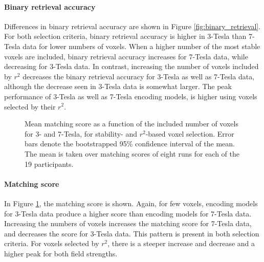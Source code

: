\paragraph{Binary retrieval accuracy}

Differences in binary retrieval accuracy are shown in Figure \ref{fig:binary_retrieval}. For both selection criteria, binary retrieval
accuracy is higher in 3-Tesla than 7-Tesla data for lower numbers of voxels.
When a higher number of the most stable voxels are included, binary retrieval accuracy increases for 7-Tesla data, while decreasing for 3-Tesla data.    
In contrast, increasing the number of voxels included by $r^2$ decreases the
binary retrieval accuracy for 3-Tesla as well as 7-Tesla data, although the
decrease seen in 3-Tesla data is somewhat larger. The peak
performance of 3-Tesla as well as 7-Tesla encoding models, is higher using
voxels selected by their $r^2$.

\begin{figure}
  \centering
  \def\svgwidth{\linewidth}
  


  \caption{Mean matching score as a function of the included number of
  voxels for 3- and 7-Tesla, for stability- and $r^2$-based voxel selection. Error bars denote the bootstrapped 95\% confidence
  interval of the mean. The mean is taken over matching scores of
  eight runs for each of the 19 participants.}

 \label{fig:matching_scores}
\end{figure}

\paragraph{Matching score}

In Figure \ref{fig:matching_scores}, the matching score is shown. Again, for
few voxels, encoding models for 3-Tesla data produce a higher score than encoding
models for 7-Tesla data. Increasing the numbers of voxels increases the matching
score for 7-Tesla data, and decreases the score for 3-Tesla data. This pattern
is present in both selection criteria. For voxels selected by $r^2$, there is a
steeper increase and decrease and a higher peak for both field strengths.

